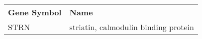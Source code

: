 \begin{tabular}{ll}
\toprule
Gene Symbol &                                 Name \\
\midrule
       STRN & striatin, calmodulin binding protein \\
\bottomrule
\end{tabular}
